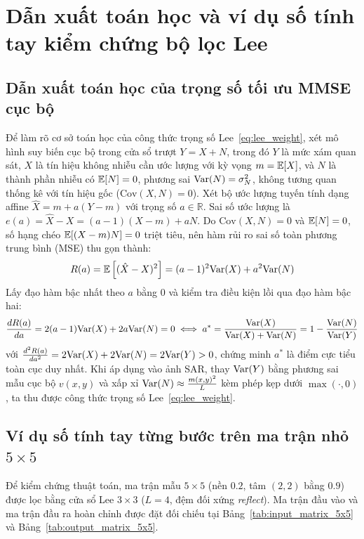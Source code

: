 \section{Dẫn xuất toán học và ví dụ số tính tay kiểm chứng bộ lọc Lee}
\label{sec:dan_xuat_vi_du_so}

\subsection{Dẫn xuất toán học của trọng số tối ưu MMSE cục bộ}

Để làm rõ cơ sở toán học của công thức trọng số Lee~\eqref{eq:lee_weight}, xét mô hình suy biến cục bộ trong cửa sổ trượt $Y = X + N$, trong đó $Y$ là mức xám quan sát, $X$ là tín hiệu không nhiễu cần ước lượng với kỳ vọng $m = \mathbb{E}[X]$, và $N$ là thành phần nhiễu có $\mathbb{E}[N] = 0$, phương sai $\mathrm{Var}(N) = \sigma_N^2$, không tương quan thống kê với tín hiệu gốc ($\mathrm{Cov}(X, N) = 0$). Xét bộ ước lượng tuyến tính dạng affine $\hat{X} = m + a(Y - m)$ với trọng số $a \in \mathbb{R}$. Sai số ước lượng là $e(a) = \hat{X} - X = (a - 1)(X - m) + aN$. Do $\mathrm{Cov}(X, N) = 0$ và $\mathbb{E}[N] = 0$, số hạng chéo $\mathbb{E}[(X - m)N] = 0$ triệt tiêu, nên hàm rủi ro sai số toàn phương trung bình (MSE) thu gọn thành:
\begin{equation}
R(a) = \mathbb{E}\left[ (\hat{X} - X)^2 \right] = (a - 1)^2 \mathrm{Var}(X) + a^2 \mathrm{Var}(N)
\label{eq:risk_function}
\end{equation}
Lấy đạo hàm bậc nhất theo $a$ bằng $0$ và kiểm tra điều kiện lồi qua đạo hàm bậc hai:
\begin{equation}
\frac{dR(a)}{da} = 2(a - 1)\mathrm{Var}(X) + 2a\mathrm{Var}(N) = 0 \iff a^* = \frac{\mathrm{Var}(X)}{\mathrm{Var}(X) + \mathrm{Var}(N)} = 1 - \frac{\mathrm{Var}(N)}{\mathrm{Var}(Y)}
\label{eq:optimal_weight_form}
\end{equation}
với $\frac{d^2 R(a)}{da^2} = 2\mathrm{Var}(X) + 2\mathrm{Var}(N) = 2\mathrm{Var}(Y) > 0$, chứng minh $a^*$ là điểm cực tiểu toàn cục duy nhất. Khi áp dụng vào ảnh SAR, thay $\mathrm{Var}(Y)$ bằng phương sai mẫu cục bộ $v(x, y)$ và xấp xỉ $\mathrm{Var}(N) \approx \frac{m(x, y)^2}{L}$ kèm phép kẹp dưới $\max(\cdot, 0)$, ta thu được công thức trọng số Lee~\eqref{eq:lee_weight}.

\subsection{Ví dụ số tính tay từng bước trên ma trận nhỏ $5 \times 5$}

Để kiểm chứng thuật toán, ma trận mẫu $5 \times 5$ (nền $0.2$, tâm $(2, 2)$ bằng $0.9$) được lọc bằng cửa sổ Lee $3 \times 3$ ($L = 4$, đệm đối xứng \textit{reflect}). Ma trận đầu vào và ma trận đầu ra hoàn chỉnh được đặt đối chiếu tại Bảng~\ref{tab:input_matrix_5x5} và Bảng~\ref{tab:output_matrix_5x5}.

